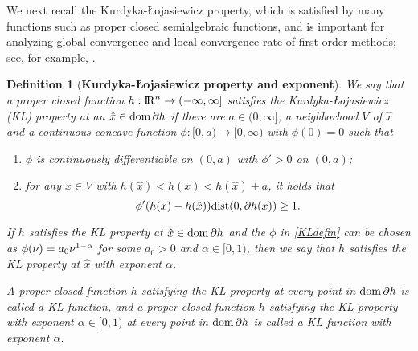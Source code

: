 \documentclass[10pt]{article}
\numberwithin{equation}{section}
\newtheorem{definition}{Definition}[section]
\def\R{{\rm I\!R}}
\def\d{{\rm dist}}
\def\dom{{\rm dom}\,}
\begin{document}
We next recall the Kurdyka-{\L}ojasiewicz property, which is satisfied by many functions such as proper closed semialgebraic functions, and is important for analyzing global convergence and local convergence rate of first-order methods; see, for example, \cite{AtBo09,AtBR10,AtBS13,BoST14,LiPong18}.
\begin{definition}[{{\bf Kurdyka-{\L}ojasiewicz property and exponent}}]
We say that a proper closed function $h:\R^n\to (-\infty, \infty]$ satisfies the Kurdyka-{\L}ojasiewicz (KL) property at an $\hat{x}\in\dom\partial h$ if there are $a\in(0,\infty]$, a neighborhood $V$ of $\hat{x}$ and a continuous concave function {\color {black} $\phi:[0,a)\to [0, \infty)$ } with {\color {black} $\phi(0) = 0$} such that
\begin{enumerate}[{\rm (i)}]
  \item {\color {black} $\phi$} is continuously differentiable on $(0, a)$ with {\color {black} $\phi' >0$} on $(0, a)$;
  \item for any $x\in V$ with $h(\hat{x}) < h(x) < h(\hat{x}) + a$, it holds that
      \begin{equation}\label{KLdefin}
      {\color {black} \phi}'(h(x) - h(\hat{x}))\d(0, \partial h(x)) \geq 1.
      \end{equation}
\end{enumerate}
If $h$ satisfies the KL property at $\hat{x}\in\dom\partial h$ and the {\color {black} $\phi$} in \eqref{KLdefin} can be chosen as ${\color {black} \phi}(\nu) = a_0\nu^{1 - \alpha}$ for some $a_0 > 0$ and $\alpha\in [0, 1)$, then we say that $h$ satisfies the KL property at $\hat{x}$ with exponent $\alpha$.

A proper closed function $h$ satisfying the KL property at every point in $\dom\partial h$ is called a KL function, and a proper closed function $h$ satisfying the KL property with exponent $\alpha\in[0,1)$ at every point in $\dom\partial h$ is called a KL function with exponent $\alpha$.
\end{definition}
\end{document}
